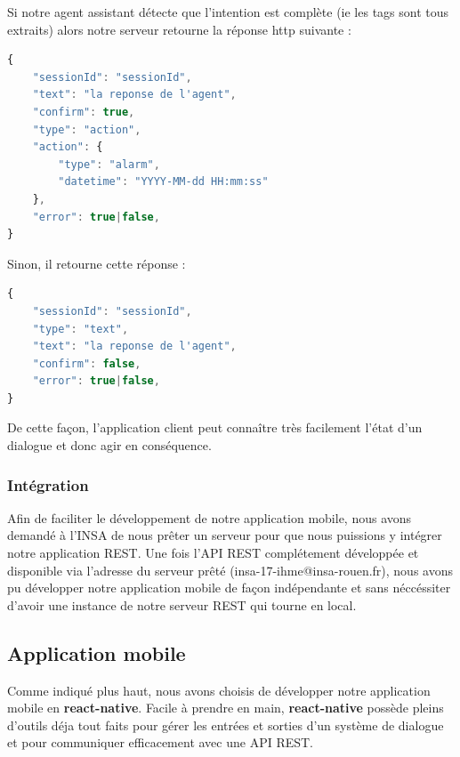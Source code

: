 Si notre agent assistant détecte que l'intention est complète (ie les tags sont tous extraits) alors notre serveur retourne la réponse http suivante :\\

\begin{lstlisting}[language=Javascript]
{
    "sessionId": "sessionId",
    "text": "la reponse de l'agent",
    "confirm": true,
    "type": "action",
    "action": {
        "type": "alarm",
        "datetime": "YYYY-MM-dd HH:mm:ss"
    },
    "error": true|false,
}
\end{lstlisting}

Sinon, il retourne cette réponse : \\

\begin{lstlisting}[language=Javascript]
{
    "sessionId": "sessionId",
    "type": "text",
    "text": "la reponse de l'agent",
    "confirm": false,
    "error": true|false,
}
\end{lstlisting}

De cette façon, l'application client peut connaître très facilement l'état d'un dialogue et donc agir en conséquence.\\

\subsubsection{Intégration}

Afin de faciliter le développement de notre application mobile, nous avons demandé à l'INSA de nous prêter un serveur pour que nous puissions y intégrer notre 
application REST. Une fois l'API REST complétement développée et disponible via l'adresse du serveur prêté (insa-17-ihme@insa-rouen.fr), nous avons pu développer 
notre application mobile de façon indépendante et sans néccéssiter d'avoir une instance de notre serveur REST qui tourne en local.

\subsection{Application mobile}

Comme indiqué plus haut, nous avons choisis de développer notre application mobile en \textbf{react-native}. Facile à prendre en main, \textbf{react-native} possède 
pleins d'outils déja tout faits pour gérer les entrées et sorties d'un système de dialogue et pour communiquer efficacement avec une API REST.\\

